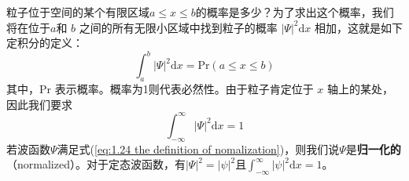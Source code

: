 	\indent 粒子位于空间的某个有限区域$a \le x \le b$的概率是多少？为了求出这个概率，我们将在位于$a$和 $b$ 之间的所有无限小区域中找到粒子的概率 $\left|\Psi\right|^2\mathrm{d}x$ 相加，这就是如下定积分的定义：
	\begin{equation}
		\boxed{\int_{a}^{b}\left|\Psi\right|^2 \mathrm{d}x = \text{Pr}\left(a \le x \le b\right)}
		\label{eq:1.23 int of probability}
	\end{equation}
	其中，Pr 表示概率。概率为1则代表必然性。由于粒子肯定位于 $x$ 轴上的某处，因此我们要求
	\begin{equation}
		\boxed{\int_{-\infty}^{\infty} \left|\Psi\right|^2 \mathrm{d}x = 1}
		\label{eq:1.24 the definition of nomalization}
	\end{equation}
	若波函数$\Psi$满足式(\ref{eq:1.24 the definition of nomalization})，则我们说$\Psi$是\textbf{归一化的}（normalized）。对于定态波函数，有$\left|\Psi\right|^2 = \left|\psi\right|^2$且$\int_{-\infty}^{\infty} \left|\psi\right|^2 \mathrm{d}x = 1$。
